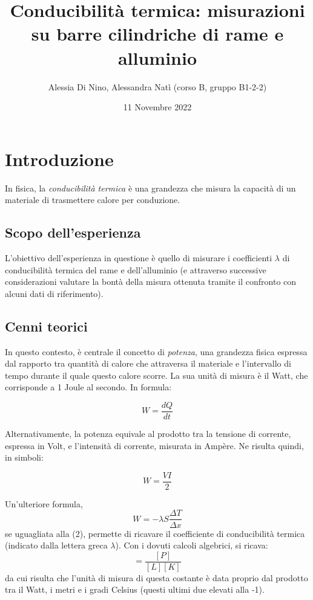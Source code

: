 \documentclass{article}
\begin{document}
\title{Conducibilità termica: misurazioni su barre cilindriche di rame e alluminio}
\author{Alessia Di Nino, Alessandra Natì (corso B, gruppo B1-2-2)}
\date{11 Novembre 2022}
\maketitle

\section{Introduzione}
In fisica, la \emph{conducibilità termica} è una grandezza che misura la capacità di un materiale di trasmettere calore per conduzione.

\subsection{Scopo dell'esperienza}
L'obiettivo dell'esperienza in questione è quello di misurare i coefficienti $\lambda$ di conducibilità termica del rame e dell'alluminio (e attraverso successive considerazioni valutare la bontà della misura ottenuta tramite il confronto con alcuni dati di riferimento).

\subsection{Cenni teorici}
In questo contesto, è centrale il concetto di \emph{potenza}, una grandezza fisica espressa dal rapporto tra quantità di calore che attraversa il materiale e l'intervallo di tempo durante il quale questo calore scorre. La sua unità di misura è il Watt, che corrisponde a 1 Joule al secondo. In formula:

\begin{equation}
W =\frac{dQ}{dt}
\end{equation}

\noindent Alternativamente, la potenza equivale al prodotto tra la tensione di corrente, espressa in Volt, e l'intensità di corrente, misurata in Ampère. Ne risulta quindi, in simboli:

\begin{equation}
W = \frac{VI}{2}
\end{equation}

\noindent Un'ulteriore formula,
\begin{equation}
W = -\lambda S \frac{\Delta T}{\Delta x}
\end{equation}
se uguagliata alla (2), permette di ricavare il coefficiente di conducibilità termica (indicato dalla lettera greca $\lambda$). Con i dovuti calcoli algebrici, si ricava:
\begin{equation}
    [\lambda] = \frac{[P]}{[L][K]}
\end{equation}
da cui risulta che l'unità di misura di questa costante è data proprio dal prodotto tra il Watt, i metri e i gradi Celsius (questi ultimi due elevati alla -1).
\end{document}
